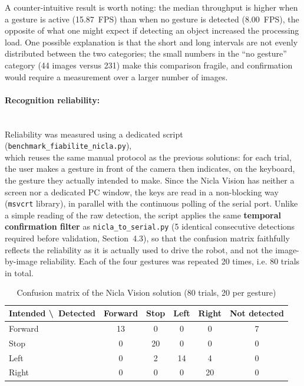 \documentclass[12pt,a4paper]{report}
\begin{document}
	A counter-intuitive result is worth noting: the median throughput is higher when a gesture is active (15.87~FPS) than when no gesture is detected (8.00~FPS), the opposite of what one might expect if detecting an object increased the processing load. One possible explanation is that the short and long intervals are not evenly distributed between the two categories; the small numbers in the ``no gesture'' category (44 images versus 231) make this comparison fragile, and confirmation would require a measurement over a larger number of images.
	
	
	\paragraph{Recognition reliability:} \mbox{} \\
	Reliability was measured using a dedicated script (\texttt{benchmark\_fiabilite\_nicla.py}), \\ which reuses the same manual protocol as the previous solutions: for each trial, the user makes a gesture in front of the camera then indicates, on the keyboard, the gesture they actually intended to make. Since the Nicla Vision has neither a screen nor a dedicated PC window, the keys are read in a non-blocking way (\texttt{msvcrt} library), in parallel with the continuous polling of the serial port. Unlike a simple reading of the raw detection, the script applies the same \textbf{temporal confirmation filter} as \texttt{nicla\_to\_serial.py} (5 identical consecutive detections required before validation, Section~4.3), so that the confusion matrix faithfully reflects the reliability as it is actually used to drive the robot, and not the image-by-image reliability. Each of the four gestures was repeated 20 times, i.e. 80 trials in total.
	
	\begin{table}[H]
		\centering
		\small
		\begin{tabular}{lccccc}
			\toprule
			\textbf{Intended \textbackslash\ Detected} & \textbf{Forward} & \textbf{Stop} & \textbf{Left} & \textbf{Right} & \textbf{Not detected} \\
			\midrule
			Forward & 13 & 0 & 0 & 0 & 7 \\
			Stop & 0 & 20 & 0 & 0 & 0 \\
			Left & 0 & 2 & 14 & 4 & 0 \\
			Right & 0 & 0 & 0 & 20 & 0 \\
			\bottomrule
		\end{tabular}
		\caption{Confusion matrix of the Nicla Vision solution (80 trials, 20 per gesture)}
		\label{tab:confusion-nicla}
	\end{table}
	
\end{document}
